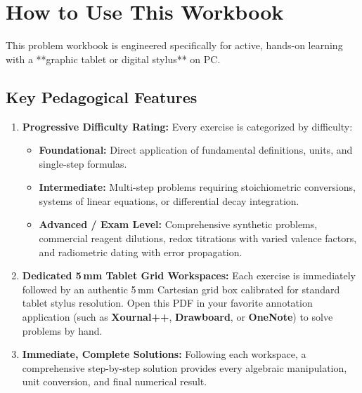 \documentclass[11pt,oneside,openany]{book}
\begin{document}
\frontmatter
\pagestyle{plain}

\chapter*{How to Use This Workbook}

This problem workbook is engineered specifically for active, hands-on learning with a **graphic tablet or digital stylus** on PC.

\section*{Key Pedagogical Features}

\begin{enumerate}[leftmargin=1.8em,itemsep=5pt]
  \item \textbf{Progressive Difficulty Rating:} Every exercise is categorized by difficulty:
  \begin{itemize}[leftmargin=1.5em,itemsep=2pt]
    \item[$\bigstar$] \textbf{Foundational:} Direct application of fundamental definitions, units, and single-step formulas.
    \item[$\bigstar\bigstar$] \textbf{Intermediate:} Multi-step problems requiring stoichiometric conversions, systems of linear equations, or differential decay integration.
    \item[$\bigstar\bigstar\bigstar$] \textbf{Advanced / Exam Level:} Comprehensive synthetic problems, commercial reagent dilutions, redox titrations with varied valence factors, and radiometric dating with error propagation.
  \end{itemize}
  \item \textbf{Dedicated 5\,mm Tablet Grid Workspaces:} Each exercise is immediately followed by an authentic 5\,mm Cartesian grid box calibrated for standard tablet stylus resolution. Open this PDF in your favorite annotation application (such as \textbf{Xournal++}, \textbf{Drawboard}, or \textbf{OneNote}) to solve problems by hand.
  \item \textbf{Immediate, Complete Solutions:} Following each workspace, a comprehensive step-by-step solution provides every algebraic manipulation, unit conversion, and final numerical result.
\end{enumerate}

\tableofcontents

\mainmatter
\pagestyle{fancy}




\end{document}
